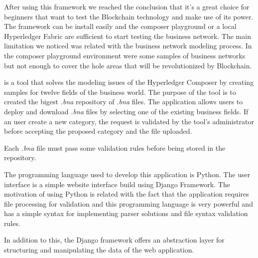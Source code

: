 After using this framework we reached the conclusion that it's a great choice for beginners that want to test the Blockchain technology and make use of its power.
The framework can be install easily and the composer playground or a local Hyperledger Fabric are sufficient to start testing the business network.
The main limitation we noticed was related with the business network modeling process.
In the composer playground environment were some samples of business networks but not enough to cover the hole areas that will be revolutionized by Blockchain.

\textbf{\project} is a tool that solves the modeling issues of the Hyperledger Composer by creating samples for twelve fields of the business world.
The purpose of the tool is to created the bigest \emph{.bna} repository of \emph{.bna} files. The application allows users to deploy and download \emph{.bna} files by selecting one of the existing business fields.
If an user create a new category, the request is validated by the tool's administrator before accepting the proposed category and the file uploaded.

Each \emph{.bna} file must pass some validation rules before being stored in the repository.

The programming language used to develop this application is Python. The user interface is a simple website interface build using Django Framework. 
The motivation of using Python is related with the fact that the application requires file processing for validation and this programming language is very powerful and has a simple syntax for implementing parser solutions and file syntax validation rules.

In addition to this, the Django framework offers an abstraction layer for structuring and manipulating the data of the web application.

 
